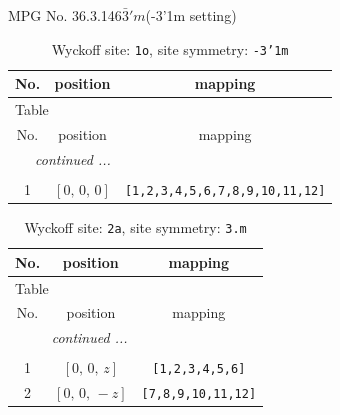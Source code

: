 \documentclass[fleqn,8pt]{jsarticle}
\begin{document}
\setcounter{MaxMatrixCols}{32}

\renewcommand{\tablename}{Table~}
\renewcommand{\figurename}{Figure~}
\begin{center}
\LARGE
MPG No. 36.3.146\quad$\bar{3}'m$\quad(-3'1m setting)
\end{center}
\renewcommand{\arraystretch}{1.2}
\begin{longtable}{ccc}
\caption{Wyckoff site: {\tt 1o}, site symmetry: {\tt -3'1m}}
 \\
 \hline \hline
No. & position & mapping \\ \hline \endfirsthead

\multicolumn{2}{l}{\tablename\ \thetable{}} \\
 \hline \hline
No. & position & mapping \\ \hline \endhead

 \hline \hline
\multicolumn{2}{r}{\footnotesize\it continued ...} \\ \endfoot

 \hline \hline
\multicolumn{2}{r}{} \\ \endlastfoot

1 & $\left[ 0,\, 0,\, 0 \right]$ & {\tt [1,2,3,4,5,6,7,8,9,10,11,12]} \\
\end{longtable}
\renewcommand{\arraystretch}{1.2}
\begin{longtable}{ccc}
\caption{Wyckoff site: {\tt 2a}, site symmetry: {\tt 3.m}}
 \\
 \hline \hline
No. & position & mapping \\ \hline \endfirsthead

\multicolumn{2}{l}{\tablename\ \thetable{}} \\
 \hline \hline
No. & position & mapping \\ \hline \endhead

 \hline \hline
\multicolumn{2}{r}{\footnotesize\it continued ...} \\ \endfoot

 \hline \hline
\multicolumn{2}{r}{} \\ \endlastfoot

1 & $\left[ 0,\, 0,\, z \right]$ & {\tt [1,2,3,4,5,6]} \\ \hline
2 & $\left[ 0,\, 0,\, - z \right]$ & {\tt [7,8,9,10,11,12]} \\
\end{longtable}
\renewcommand{\arraystretch}{1.2}
\end{document}

